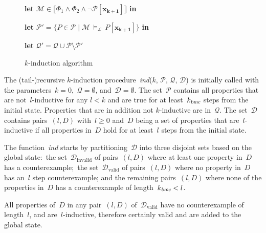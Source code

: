 \documentclass[12pt]{article}
\renewcommand{\textproc}{\textsl}
\newcommand{\Let}{\textbf{let} }
\newcommand{\In}{\textbf{in}}
\renewcommand{\vec}[1]{\mathbf{#1}}            %
\newcommand{\lo}{\mathcal{L}}                  %
\newcommand{\lent}{\,\models_\lo\,}            %
\newcommand{\ext}[1]{\llbracket #1 \rrbracket} %
\begin{document}
\begin{figure}[tp]
\begin{algorithmic}[1]
          \State \Return

        \EndIf

      \EndIf

      \Else

      \State \Let $\mathcal{M} \in \ext{\Phi_1 \land \Phi_2 \land \lnot \mathcal{P}[\vec{x_{k+1}}]}$ \In

      \State \Let $\mathcal{P}' = \{P \in \mathcal{P} \mid \mathcal{M} \lent P[\vec{x_{k+1}}] \}$ \In      

      \State \Let $\mathcal{Q}' = \mathcal{Q} \cup \mathcal{P} \setminus \mathcal{P}'$

      \State {}

    \EndIf
    \EndFunction
  \end{algorithmic}
  \caption{$k$-induction algorithm}
\end{figure}

The (tail-)recursive $k$\nobreakdash-induction procedure~\textproc{ind}($k$, $\mathcal{P}$, $\mathcal{Q}$, $\mathcal{D}$) is initially called with the parameters~${k = 0}$,~${\mathcal{Q} = \emptyset}$, and~${\mathcal{D} = \emptyset}$. The set~$\mathcal{P}$ contains all properties that are not~$l$\nobreakdash-inductive for any $l < k$ and are true for at least~$k_\textproc{bmc}$ steps from the initial state. Properties that are in addition not $k$\nobreakdash-inductive are in~$\mathcal{Q}$. The set~$\mathcal{D}$ contains pairs~$(l,D)$ with~${l \geq 0}$ and~$D$ being a set of properties that are~$l$\nobreakdash-inductive if all properties in~$D$ hold for at least~$l$ steps from the initial state.

The function~\textproc{ind} starts by partitioning~$\mathcal{D}$ into three disjoint sets based on the global state:~the set~$\mathcal{D}_\mathrm{invalid}$ of pairs~$(l,D)$ where at least one property in~$D$ has a counterexample;~the set~$\mathcal{D}_\mathrm{valid}$ of pairs~$(l,D)$ where no property in~$D$ has an~$l$ step counterexample; and the remaining pairs~$(l,D)$ where none of the properties in~$D$ has a counterexample of length~$k_\textproc{bmc} < l$. 

All properties of~$D$ in any pair~$(l,D)$ of~$\mathcal{D}_\mathrm{valid}$ have no counterexample of length~$l$, and are~$l$\nobreakdash-inductive, therefore  certainly valid and are added to the global state. 
\end{document}
